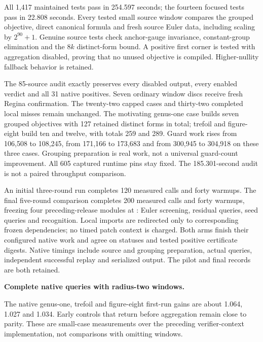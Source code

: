 All 1,417 maintained tests pass in 254.597 seconds; the fourteen focused
tests pass in 22.808 seconds. Every tested small source window compares
the grouped objective, direct canonical formula and fresh source Euler data,
including scaling by $2^{90}+1$. Genuine source tests check anchor-gauge
invariance, constant-group elimination and the $8k$ distinct-form bound.
A positive first corner is tested with aggregation disabled, proving that
no unused objective is compiled. Higher-nullity fallback behavior is retained.

The 85-source audit exactly preserves every disabled output, every enabled
verdict and all 31 native positives. Seven ordinary window discs receive
fresh Regina confirmation. The twenty-two capped cases and thirty-two
completed local misses remain unchanged. The motivating genus-one case
builds seven grouped objectives with 127 retained distinct forms in total;
trefoil and figure-eight build ten and twelve, with totals 259 and 289.
Guard work rises from 106,508 to 108,245, from 171,166 to 173,683 and from
300,945 to 304,918 on these three cases. Grouping preparation is real work,
not a universal guard-count improvement. All 605 captured runtime pins stay
fixed. The 185.301-second audit is not a paired throughput comparison.

An initial three-round run completes 120 measured calls and forty warmups.
The final five-round comparison completes 200 measured calls and forty
warmups, freezing four preceding-release modules at :
Euler screening, residual queries, seed queries and recognition. Local imports
are redirected only to corresponding frozen dependencies; no timed patch
context is charged. Both arms finish their configured native work and
agree on statuses and tested positive certificate digests. Native timings
include source and grouping preparation, actual queries, independent successful
replay and serialized output. The pilot and final records are both retained.

\begin{samepage}
\noindent\textbf{Complete native queries with radius-two windows.}

\end{samepage}

The native genus-one, trefoil and figure-eight first-run gains are about
1.064, 1.027 and 1.034. Early controls that return before aggregation remain
close to parity. These are small-case measurements over the preceding
verifier-context implementation, not comparisons with omitting windows.

